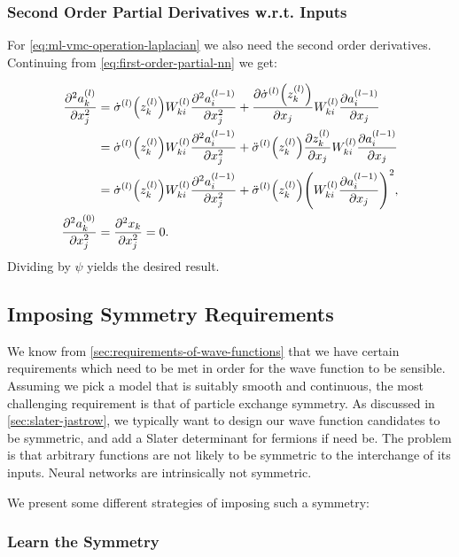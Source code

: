 \documentclass[Thesis.tex]{subfiles}
\begin{document}
\subsubsection{Second Order Partial Derivatives w.r.t. Inputs}

For \cref{eq:ml-vmc-operation-laplacian} we also need the second order
derivatives. Continuing from \cref{eq:first-order-partial-nn} we get:

\begin{align}
  \pdv[2]{a_k^{(l)}}{x_j} &= \dot\sigma^{(l)}\qty(z_k^{(l)})W_{ki}^{(l)}\pdv[2]{a_i^{(l-1)}}{x_j} + \pdv{\dot\sigma^{(l)}\qty(z_k^{(l)})}{x_j}W_{ki}^{(l)}\pdv{a_i^{(l-1)}}{x_j}\\
  &= \dot\sigma^{(l)}\qty(z_k^{(l)})W_{ki}^{(l)}\pdv[2]{a_i^{(l-1)}}{x_j} + \ddot\sigma^{(l)}\qty(z_k^{(l)})\pdv{z_k^{(l)}}{x_j}W_{ki}^{(l)}\pdv{a_i^{(l-1)}}{x_j}\\
                          &= \dot\sigma^{(l)}\qty(z_k^{(l)})W_{ki}^{(l)}\pdv[2]{a_i^{(l-1)}}{x_j} + \ddot\sigma^{(l)}\qty(z_k^{(l)})\qty(W_{ki}^{(l)}\pdv{a_i^{(l-1)}}{x_j})^2,\\
                            \pdv[2]{a_k^{(0)}}{x_j} &= \pdv[2]{x_k}{x_j} = 0.
\end{align}
Dividing by $\psi$ yields the desired result.


\subsection{Imposing Symmetry Requirements}

We know from \cref{sec:requirements-of-wave-functions} that we have certain
requirements which need to be met in order for the wave function to be sensible.
Assuming we pick a model that is suitably smooth and continuous, the most
challenging requirement is that of particle exchange symmetry. As discussed in
\cref{sec:slater-jastrow}, we typically want to design our wave function
candidates to be symmetric, and add a Slater determinant for fermions if need
be. The problem is that arbitrary functions are not likely to be symmetric to the
interchange of its inputs. Neural networks are intrinsically not symmetric.

We present some different strategies of imposing such a symmetry:

\subsubsection{Learn the Symmetry}
\end{document}
